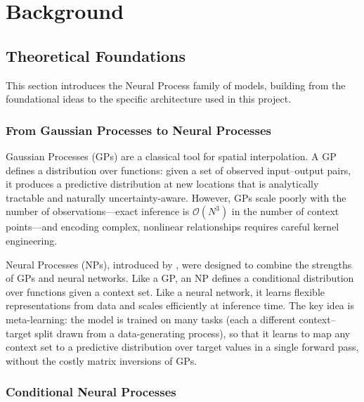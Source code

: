 \chapter{Background}
\section{Theoretical Foundations}

This section introduces the Neural Process family of models, building from the foundational ideas to the specific architecture used in this project.

\subsection{From Gaussian Processes to Neural Processes}

Gaussian Processes (GPs) are a classical tool for spatial interpolation. A GP defines a distribution over functions: given a set of observed input--output pairs, it produces a predictive distribution at new locations that is analytically tractable and naturally uncertainty-aware. However, GPs scale poorly with the number of observations---exact inference is $\mathcal{O}(N^3)$ in the number of context points---and encoding complex, nonlinear relationships requires careful kernel engineering.

Neural Processes (NPs), introduced by \citet{garnelo2018np}, were designed to combine the strengths of GPs and neural networks. Like a GP, an NP defines a conditional distribution over functions given a context set. Like a neural network, it learns flexible representations from data and scales efficiently at inference time. The key idea is meta-learning: the model is trained on many tasks (each a different context--target split drawn from a data-generating process), so that it learns to map any context set to a predictive distribution over target values in a single forward pass, without the costly matrix inversions of GPs.

\subsection{Conditional Neural Processes}

